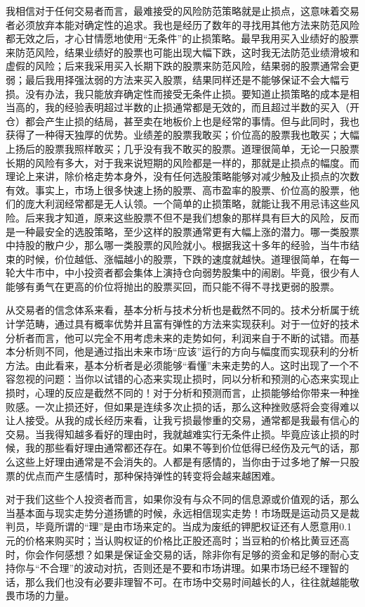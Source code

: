 我相信对于任何交易者而言，最难接受的风险防范策略就是止损点，这意味着交易者必须放弃本能对确定性的追求。我也是经历了数年的寻找用其他方法来防范风险都无效之后，才心甘情愿地使用“无条件”的止损策略。最早我用买入业绩好的股票来防范风险，结果业绩好的股票也可能出现大幅下跌，这时我无法防范业绩滑坡和虚假的风险；后来我采用买入长期下跌的股票来防范风险，结果弱的股票通常会更弱；最后我用择强汰弱的方法来买入股票，结果同样还是不能够保证不会大幅亏损。没有办法，我只能放弃确定性而接受无条件止损。要知道止损策略的成本是相当高的，我的经验表明超过半数的止损通常都是无效的，而且超过半数的买入（开仓）都会产生止损的结局，甚至卖在地板价上也是经常的事情。但与此同时，我也获得了一种得天独厚的优势。业绩差的股票我敢买；价位高的股票我也敢买；大幅上扬后的股票我照样敢买；几乎没有我不敢买的股票。道理很简单，无论一只股票长期的风险有多大，对于我来说短期的风险都是一样的，那就是止损点的幅度。而理论上来讲，除价格走势本身外，没有任何选股策略能够对减少触及止损点的次数有效。事实上，市场上很多快速上扬的股票、高市盈率的股票、价位高的股票，他们的庞大利润经常都是无人认领。一个简单的止损策略，就能让我不用忌讳这些风险。后来我才知道，原来这些股票不但不是我们想象的那样具有巨大的风险，反而是一种最安全的选股策略，至少这样的股票通常更有大幅上涨的潜力。哪一类股票中持股的散户少，那么哪一类股票的风险就小。根据我这十多年的经验，当牛市结束的时候，价位越低、涨幅越小的股票，下跌的速度就越快。道理很简单，在每一轮大牛市中，中小投资者都会集体上演持仓向弱势股集中的闹剧。毕竟，很少有人能够有勇气在更高的价位将抛出的股票买回，而只能不得不寻找更弱的股票。

从交易者的信念体系来看，基本分析与技术分析也是截然不同的。技术分析属于统计学范畴，通过具有概率优势并且富有弹性的方法来实现获利。对于一位好的技术分析者而言，他可以完全不用考虑未来的走势如何，利润来自于不断的试错。而基本分析则不同，他是通过指出未来市场“应该”运行的方向与幅度而实现获利的分析方法。由此看来，基本分析者是必须能够“看懂”未来走势的人。这时出现了一个不容忽视的问题：当你以试错的心态来实现止损时，同以分析和预测的心态来实现止损时，心理的反应是截然不同的！对于分析和预测而言，止损能够给你带来一种挫败感。一次止损还好，但如果是连续多次止损的话，那么这种挫败感将会变得难以让人接受。从我的成长经历来看，让我亏损最惨重的交易，通常都是我最有信心的交易。当我得知越多看好的理由时，我就越难实行无条件止损。毕竟应该止损的时候，我的那些看好理由通常都还存在。如果不等到价位低得已经伤及元气的话，那么这些上好理由通常是不会消失的。人都是有感情的，当你由于过多地了解一只股票的优点而产生感情时，那种保持弹性的转变将会越来越困难。

对于我们这些个人投资者而言，如果你没有与众不同的信息源或价值观的话，那么当基本面与现实走势分道扬镳的时候，永远相信现实走势！市场既是运动员又是裁判员，毕竟所谓的“理”是由市场来定的。当成为废纸的钾肥权证还有人愿意用0.1元的价格来购买时；当认购权证的价格比正股还高时；当豆粕的价格比黄豆还高时，你会作何感想？如果是保证金交易的话，除非你有足够的资金和足够的耐心支持你与“不合理”的波动对抗，否则还是不要和市场讲理。如果市场已经不理智的话，那么我们也没有必要非理智不可。在市场中交易时间越长的人，往往就越能敬畏市场的力量。

